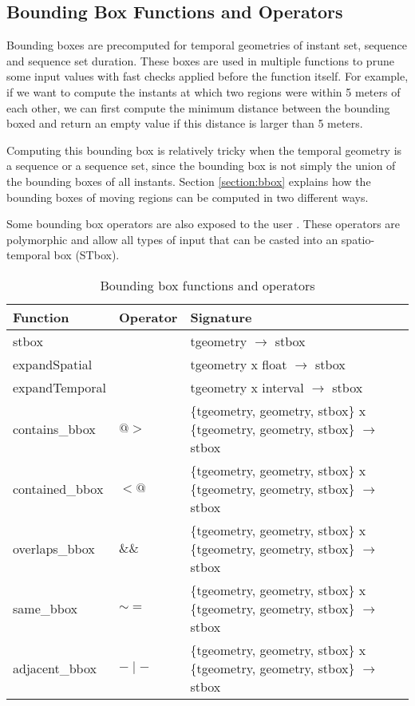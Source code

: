 
\subsection{Bounding Box Functions and Operators}
\label{section:bbox_funcs}

Bounding boxes are precomputed for temporal geometries of instant set, sequence and sequence set duration. These boxes are used in multiple functions to prune some input values with fast checks applied before the function itself. For example, if we want to compute the instants at which two regions were within 5 meters of each other, we can first compute the minimum distance between the bounding boxed and return an empty value if this distance is larger than 5 meters.

Computing this bounding box is relatively tricky when the temporal geometry is a sequence or a sequence set, since the bounding box is not simply the union of the bounding boxes of all instants. Section \ref{section:bbox} explains how the bounding boxes of moving regions can be computed in two different ways.

Some bounding box operators are also exposed to the user . These operators are polymorphic and allow all types of input that can be casted into an spatio-temporal box (STbox). 

\begin{table}[h!]
    \centering
    \begin{tabularx}{\textwidth}{|l|l|X|}
    \hline
    \textbf{Function}   & \textbf{Operator} & \textbf{Signature} \\ 
    \hline
    stbox               & & tgeometry $\rightarrow$ stbox\\
    \hline
    expandSpatial       & & tgeometry x float $\rightarrow$ stbox\\
    \hline
    expandTemporal      & & tgeometry x interval $\rightarrow$ stbox \\
    \hline
    contains\_bbox      & $@>$ & \{tgeometry, geometry, stbox\} x \{tgeometry, geometry, stbox\} $\rightarrow$ stbox \\
    \hline
    contained\_bbox     & $<@$ & \{tgeometry, geometry, stbox\} x \{tgeometry, geometry, stbox\} $\rightarrow$ stbox \\
    \hline
    overlaps\_bbox      & $\&\&$ & \{tgeometry, geometry, stbox\} x \{tgeometry, geometry, stbox\} $\rightarrow$ stbox \\
    \hline
    same\_bbox          & $\sim=$ & \{tgeometry, geometry, stbox\} x \{tgeometry, geometry, stbox\} $\rightarrow$ stbox \\
    \hline
    adjacent\_bbox      & $-\mid-$ & \{tgeometry, geometry, stbox\} x \{tgeometry, geometry, stbox\} $\rightarrow$ stbox \\
    \hline
    \end{tabularx}
    \caption{Bounding box functions and operators}
    \label{table:bbox_funcs}
\end{table}

